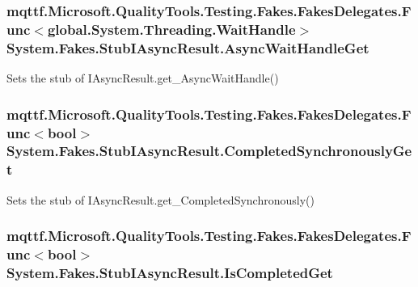 \hypertarget{class_system_1_1_fakes_1_1_stub_i_async_result_a971e3194aa4bcd8fedcd36aeb0119d4b}{
\subsubsection[{Async\-Wait\-Handle\-Get}]{\setlength{\rightskip}{0pt plus 5cm}mqttf.\-Microsoft.\-Quality\-Tools.\-Testing.\-Fakes.\-Fakes\-Delegates.\-Func$<$global.\-System.\-Threading.\-Wait\-Handle$>$ System.\-Fakes.\-Stub\-I\-Async\-Result.\-Async\-Wait\-Handle\-Get}}\label{class_system_1_1_fakes_1_1_stub_i_async_result_a971e3194aa4bcd8fedcd36aeb0119d4b}


Sets the stub of I\-Async\-Result.\-get\-\_\-\-Async\-Wait\-Handle()

\hypertarget{class_system_1_1_fakes_1_1_stub_i_async_result_a3e4b088594c0f7c329cbc026ce72526b}{
\subsubsection[{Completed\-Synchronously\-Get}]{\setlength{\rightskip}{0pt plus 5cm}mqttf.\-Microsoft.\-Quality\-Tools.\-Testing.\-Fakes.\-Fakes\-Delegates.\-Func$<$bool$>$ System.\-Fakes.\-Stub\-I\-Async\-Result.\-Completed\-Synchronously\-Get}}\label{class_system_1_1_fakes_1_1_stub_i_async_result_a3e4b088594c0f7c329cbc026ce72526b}


Sets the stub of I\-Async\-Result.\-get\-\_\-\-Completed\-Synchronously()

\hypertarget{class_system_1_1_fakes_1_1_stub_i_async_result_aea56f5c046b78a4705d06db301186f24}{
\subsubsection[{Is\-Completed\-Get}]{\setlength{\rightskip}{0pt plus 5cm}mqttf.\-Microsoft.\-Quality\-Tools.\-Testing.\-Fakes.\-Fakes\-Delegates.\-Func$<$bool$>$ System.\-Fakes.\-Stub\-I\-Async\-Result.\-Is\-Completed\-Get}}\label{class_system_1_1_fakes_1_1_stub_i_async_result_aea56f5c046b78a4705d06db301186f24}


